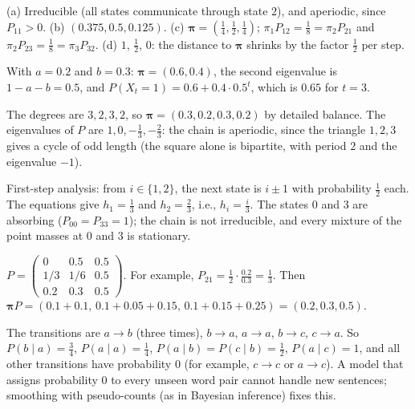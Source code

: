 \documentclass[11pt]{article}
\begin{document}
\begin{description}[leftmargin=0pt, itemsep=0.3em]
    \item[\ref{pr:lazy-chain}.] (a) Irreducible (all states communicate through state $2$), and aperiodic, since $P_{11} > 0$. (b) $(0.375, 0.5, 0.125)$. (c) $\boldsymbol{\pi} = (\frac{1}{4}, \frac{1}{2}, \frac{1}{4})$; $\pi_1 P_{12} = \frac{1}{8} = \pi_2 P_{21}$ and $\pi_2 P_{23} = \frac{1}{8} = \pi_3 P_{32}$. (d) $1$, $\frac{1}{2}$, $0$: the distance to $\boldsymbol{\pi}$ shrinks by the factor $\frac{1}{2}$ per step.
    \item[\ref{pr:two-state}.] With $a = 0.2$ and $b = 0.3$: $\boldsymbol{\pi} = (0.6, 0.4)$, the second eigenvalue is $1 - a - b = 0.5$, and $P(X_t = 1) = 0.6 + 0.4 \cdot 0.5^t$, which is $0.65$ for $t = 3$.
    \item[\ref{pr:graph-walk}.] The degrees are $3, 2, 3, 2$, so $\boldsymbol{\pi} = (0.3, 0.2, 0.3, 0.2)$ by detailed balance. The eigenvalues of $P$ are $1, 0, -\frac{1}{3}, -\frac{2}{3}$: the chain is aperiodic, since the triangle $1, 2, 3$ gives a cycle of odd length (the square alone is bipartite, with period $2$ and the eigenvalue $-1$).
    \item[\ref{pr:gamblers-ruin}.] First-step analysis: from $i \in \{1, 2\}$, the next state is $i \pm 1$ with probability $\frac{1}{2}$ each. The equations give $h_1 = \frac{1}{3}$ and $h_2 = \frac{2}{3}$, i.e., $h_i = \frac{i}{3}$. The states $0$ and $3$ are absorbing ($P_{00} = P_{33} = 1$); the chain is not irreducible, and every mixture of the point masses at $0$ and $3$ is stationary.
    \item[\ref{pr:metropolis}.] $P = \begin{pmatrix} 0 & 0.5 & 0.5 \\ 1/3 & 1/6 & 0.5 \\ 0.2 & 0.3 & 0.5 \end{pmatrix}$. For example, $P_{21} = \frac{1}{2} \cdot \frac{0.2}{0.3} = \frac{1}{3}$. Then $\boldsymbol{\pi}P = (0.1 + 0.1, \, 0.1 + 0.05 + 0.15, \, 0.1 + 0.15 + 0.25) = (0.2, 0.3, 0.5)$.
    \item[\ref{pr:bigram}.] The transitions are $a \to b$ (three times), $b \to a$, $a \to a$, $b \to c$, $c \to a$. So $P(b \mid a) = \frac{3}{4}$, $P(a \mid a) = \frac{1}{4}$, $P(a \mid b) = P(c \mid b) = \frac{1}{2}$, $P(a \mid c) = 1$, and all other transitions have probability $0$ (for example, $c \to c$ or $a \to c$). A model that assigns probability $0$ to every unseen word pair cannot handle new sentences; smoothing with pseudo-counts (as in Bayesian inference) fixes this.

\end{description}
\end{document}
